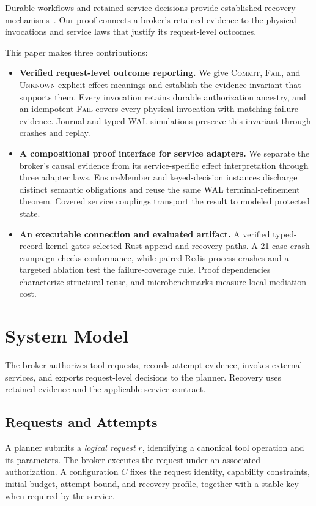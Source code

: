 \documentclass[acmsmall,screen,review,anonymous]{acmart}
\newcommand{\Unknown}{\textsc{Unknown}\xspace}
\newcommand{\Commit}{\textsc{Commit}\xspace}
\newcommand{\Fail}{\textsc{Fail}\xspace}
\begin{document}
Durable workflows and retained service decisions provide established recovery
mechanisms~\cite{temporal2026activity,lee2015rifl}. Our proof connects a
broker's retained evidence to the physical invocations and service laws
that justify its request-level outcomes.

This paper makes three contributions:
\begin{itemize}
  \item \textbf{Verified request-level outcome reporting.}
  We give \Commit, \Fail, and \Unknown explicit effect meanings and
  establish the evidence invariant that supports them. Every invocation
  retains durable authorization ancestry, and an idempotent \Fail covers
  every physical invocation with matching failure evidence. Journal and
  typed-WAL simulations preserve this invariant through crashes and replay.
  \item \textbf{A compositional proof interface for service adapters.}
  We separate the broker's causal evidence from its service-specific
  effect interpretation through three adapter laws. EnsureMember and
  keyed-decision instances discharge distinct semantic obligations and
  reuse the same WAL terminal-refinement theorem. Covered service
  couplings transport the result to modeled protected state.
  \item \textbf{An executable connection and evaluated artifact.}
  A verified typed-record kernel gates selected Rust append and recovery
  paths. A 21-case crash campaign checks conformance, while paired Redis
  process crashes and a targeted ablation test the failure-coverage rule.
  Proof dependencies characterize structural reuse, and microbenchmarks
  measure local mediation cost.
\end{itemize}

\section{System Model}
\label{sec:system-model}
The broker authorizes tool requests, records attempt evidence, invokes
external services, and exports request-level decisions to the planner.
Recovery uses retained evidence and the applicable service contract.

\subsection{Requests and Attempts}

A planner submits a \emph{logical request} $r$, identifying a canonical
tool operation and its parameters. The broker executes the request
under an associated authorization. A configuration $C$ fixes the
request identity, capability constraints, initial budget, attempt bound,
and recovery profile, together with a stable key when required by the
service.
\end{document}
